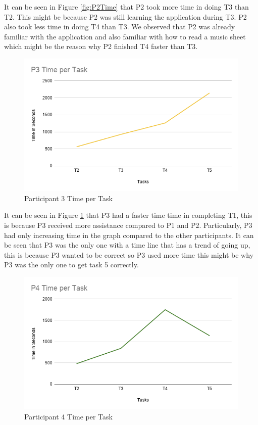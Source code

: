 It can be seen in Figure \ref{fig:P2Time} that P2 took more time in doing T3 than T2. This might be because P2 was still learning the application during T3. P2 also took less time in doing T4 than T3. We observed that P2 was already familiar with the application and also familiar with how to read a music sheet which might be the reason why P2 finished T4 faster than T3. 

\begin{figure}[H]
    \centering
    \includegraphics[width=15cm]{figures/Results/P3Time.png}
    \caption{Participant 3 Time per Task}
    \label{fig:P3Time}
\end{figure}

It can be seen in Figure \ref{fig:P3Time} that P3 had a faster time time in completing T1, this is because P3 received more assistance compared to P1 and P2. Particularly, P3 had only increasing time in the graph compared to the other participants. It can be seen that P3 was the only one with a time line that has a trend of going up, this is because P3 wanted to be correct so P3 used more time this might be why P3 was the only one to get task 5 correctly. 

\begin{figure}[H]
    \centering
    \includegraphics[width=15cm]{figures/Results/P4Time.png}
    \caption{Participant 4 Time per Task}
    \label{fig:P4Time}
\end{figure}

